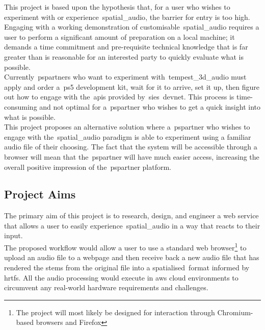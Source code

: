 This project is based upon the hypothesis that, for a user who wishes to experiment with or experience~\gls{spatial_audio}, the barrier for entry is too high.
Engaging with a working demonstration of customisable~\gls{spatial_audio} requires a user to perform a significant amount of preparation on a local machine;
it demands a time commitment and pre-requisite technical knowledge that is far greater than is reasonable for an interested party to quickly evaluate what is possible.\\

Currently~\glspl{pspartner} who want to experiment with~\gls{tempest_3d_audio} must apply and order a~\gls{ps5} development kit, wait for it to arrive, set it up, then figure out how to engage with the~\glspl{api} provided by~\gls{sie}\textquotesingle s~\gls{devnet}.
This process is time-consuming and not optimal for a~\gls{pspartner} who wishes to get a quick insight into what is possible.\\

This project proposes an alternative solution where a~\gls{pspartner} who wishes to engage with the~\gls{spatial_audio} paradigm is able to experiment using a familiar audio file of their choosing.
The fact that the system will be accessible through a browser will mean that the~\gls{pspartner} will have much easier access, increasing the overall positive impression of the~\gls{pspartner} platform.\\

\subsection{Project Aims}\label{subsec:aims}

The primary aim of this project is to research, design, and engineer a web service that allows a user to easily experience~\gls{spatial_audio} in a way that reacts to their input.\\

The proposed workflow would allow a user to use a standard web browser\footnote{The project will most likely be designed for interaction through Chromium-based browsers and Firefox} to upload an audio file to a webpage and then receive back a new audio file that has rendered the stems from the original file into a \textquotesingle spatialised\textquotesingle ~format informed by \glspl{hrtf}.
All the audio processing would execute in \gls{aws} cloud environments to circumvent any real-world hardware requirements and challenges.\\

